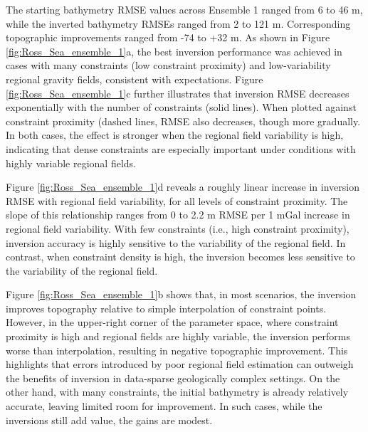 \documentclass[tc, manuscript]{copernicus}
\begin{document}
The starting bathymetry RMSE values across Ensemble 1 ranged from 6 to 46 m, while the inverted bathymetry RMSEs ranged from 2 to 121 m. Corresponding topographic improvements ranged from -74 to +32 m. As shown in Figure \ref{fig:Ross_Sea_ensemble_1}a, the best inversion performance was achieved in cases with many constraints (low constraint proximity) and low-variability regional gravity fields, consistent with expectations. Figure \ref{fig:Ross_Sea_ensemble_1}c further illustrates that inversion RMSE decreases exponentially with the number of constraints (solid lines). When plotted against constraint proximity (dashed lines, RMSE also decreases, though more gradually. In both cases, the effect is stronger when the regional field variability is high, indicating that dense constraints are especially important under conditions with highly variable regional fields.

Figure \ref{fig:Ross_Sea_ensemble_1}d reveals a roughly linear increase in inversion RMSE with regional field variability, for all levels of constraint proximity. The slope of this relationship ranges from 0 to 2.2 m RMSE per 1 mGal increase in regional field variability. With few constraints (i.e., high constraint proximity), inversion accuracy is highly sensitive to the variability of the regional field. In contrast, when constraint density is high, the inversion becomes less sensitive to the variability of the regional field.

Figure \ref{fig:Ross_Sea_ensemble_1}b shows that, in most scenarios, the inversion improves topography relative to simple interpolation of constraint points.  However, in the upper-right corner of the parameter space, where constraint proximity is high and regional fields are highly variable, the inversion performs worse than interpolation, resulting in negative topographic improvement. This highlights that errors introduced by poor regional field estimation can outweigh the benefits of inversion in data-sparse geologically complex settings. On the other hand, with many constraints, the initial bathymetry is already relatively accurate, leaving limited room for improvement. In such cases, while the inversions still add value, the gains are modest.
\end{document}
